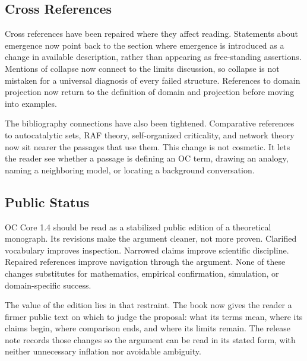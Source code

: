 \documentclass[11pt,a4paper,openany]{book}
\begin{document}
\subsection{Cross References}
Cross references have been repaired where they affect reading. Statements about emergence now point back to the section where emergence is introduced as a change in available description, rather than appearing as free-standing assertions. Mentions of collapse now connect to the limits discussion, so collapse is not mistaken for a universal diagnosis of every failed structure. References to domain projection now return to the definition of domain and projection before moving into examples. \cite{kauffman_autocatalytic,raf_networks}\par
The bibliography connections have also been tightened. Comparative references to autocatalytic sets, RAF theory, self-organized criticality, and network theory now sit nearer the passages that use them. This change is not cosmetic. It lets the reader see whether a passage is defining an OC term, drawing an analogy, naming a neighboring model, or locating a background conversation.\par
\subsection{Public Status}
OC Core 1.4 should be read as a stabilized public edition of a theoretical monograph. Its revisions make the argument cleaner, not more proven. Clarified vocabulary improves inspection. Narrowed claims improve scientific discipline. Repaired references improve navigation through the argument. None of these changes substitutes for mathematics, empirical confirmation, simulation, or domain-specific success. \cite{kauffman_autocatalytic,raf_networks}\par
The value of the edition lies in that restraint. The book now gives the reader a firmer public text on which to judge the proposal: what its terms mean, where its claims begin, where comparison ends, and where its limits remain. The release note records those changes so the argument can be read in its stated form, with neither unnecessary inflation nor avoidable ambiguity.\par
\clearpage
\nocite{*}
\printbibliography[heading=bibintoc,title={Bibliography}]
\end{document}
